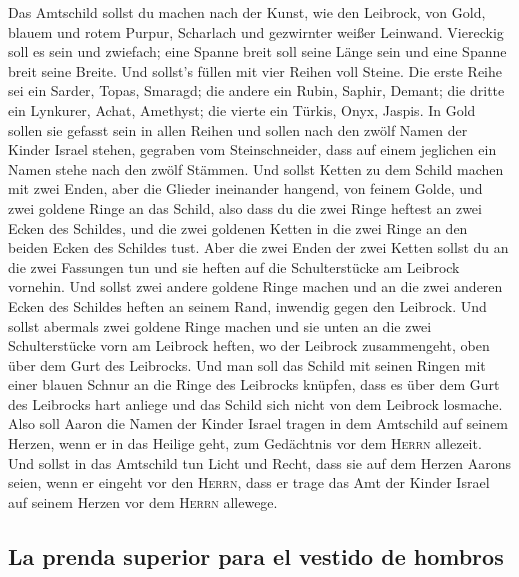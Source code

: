  Das Amtschild sollst du machen nach der Kunst, wie den
Leibrock, von Gold, blauem und rotem Purpur, Scharlach und gezwirnter
weißer Leinwand.  Viereckig soll es sein und zwiefach;
eine Spanne breit soll seine Länge sein und eine Spanne breit seine
Breite.  Und sollst's füllen mit vier Reihen voll Steine.
Die erste Reihe sei ein Sarder, Topas, Smaragd;  die
andere ein Rubin, Saphir, Demant;  die dritte ein
Lynkurer, Achat, Amethyst;  die vierte ein Türkis, Onyx,
Jaspis. In Gold sollen sie gefasst sein in allen Reihen 
und sollen nach den zwölf Namen der Kinder Israel stehen, gegraben vom
Steinschneider, dass auf einem jeglichen ein Namen stehe nach den zwölf
Stämmen.  Und sollst Ketten zu dem Schild machen mit zwei
Enden, aber die Glieder ineinander hangend, von feinem Golde,
 und zwei goldene Ringe an das Schild, also dass du die
zwei Ringe heftest an zwei Ecken des Schildes,  und die
zwei goldenen Ketten in die zwei Ringe an den beiden Ecken des Schildes
tust.  Aber die zwei Enden der zwei Ketten sollst du an
die zwei Fassungen tun und sie heften auf die Schulterstücke am Leibrock
vornehin.  Und sollst zwei andere goldene Ringe machen
und an die zwei anderen Ecken des Schildes heften an seinem Rand,
inwendig gegen den Leibrock.  Und sollst abermals zwei
goldene Ringe machen und sie unten an die zwei Schulterstücke vorn am
Leibrock heften, wo der Leibrock zusammengeht, oben über dem Gurt des
Leibrocks.  Und man soll das Schild mit seinen Ringen mit
einer blauen Schnur an die Ringe des Leibrocks knüpfen, dass es über dem
Gurt des Leibrocks hart anliege und das Schild sich nicht von dem
Leibrock losmache.  Also soll Aaron die Namen der Kinder
Israel tragen in dem Amtschild auf seinem Herzen, wenn er in das Heilige
geht, zum Gedächtnis vor dem \textsc{Herrn} allezeit. 
Und sollst in das Amtschild tun Licht und Recht, dass sie auf dem Herzen
Aarons seien, wenn er eingeht vor den \textsc{Herrn}, dass er trage das
Amt der Kinder Israel auf seinem Herzen vor dem \textsc{Herrn} allewege.

\hypertarget{la-prenda-superior-para-el-vestido-de-hombros}{%
\subsection{La prenda superior para el vestido de
hombros}\label{la-prenda-superior-para-el-vestido-de-hombros}}

